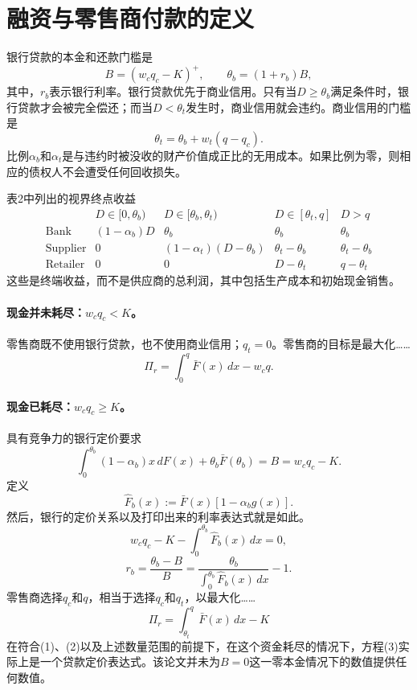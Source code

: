 \documentclass{article}
\begin{document}
\section*{融资与零售商付款的定义}
银行贷款的本金和还款门槛是
\[
B=(w_cq_c-K)^+,\qquad \theta_b=(1+r_b)B,
\]
其中，$r_b$表示银行利率。银行贷款优先于商业信用。只有当$D\geq\theta_b$满足条件时，银行贷款才会被完全偿还；而当$D<\theta_t$发生时，商业信用就会违约。商业信用的门槛是
\begin{equation}
\theta_t=\theta_b+w_t(q-q_c).\tag{1}
\end{equation}
比例$\alpha_b$和$\alpha_t$是与违约时被没收的财产价值成正比的无用成本。如果比例为零，则相应的债权人不会遭受任何回收损失。

表2中列出的视界终点收益
\[
\begin{array}{c|cccc}
& D\in[0,\theta_b)&D\in[\theta_b,\theta_t)&D\in[\theta_t,q]&D>q\\ \hline
\text{Bank}&(1-\alpha_b)D&\theta_b&\theta_b&\theta_b\\
\text{Supplier}&0&(1-\alpha_t)(D-\theta_b)&\theta_t-\theta_b&\theta_t-\theta_b\\
\text{Retailer}&0&0&D-\theta_t&q-\theta_t
\end{array}
\]
这些是终端收益，而不是供应商的总利润，其中包括生产成本和初始现金销售。

\paragraph{现金并未耗尽：$w_cq_c<K$。}
零售商既不使用银行贷款，也不使用商业信用；$q_t=0$。零售商的目标是最大化……
\[
\Pi_r=\int_0^q\bar F(x)\,dx-w_cq.
\]

\paragraph{现金已耗尽：$w_cq_c\geq K$。}
具有竞争力的银行定价要求
\[
\int_0^{\theta_b}(1-\alpha_b)x\,dF(x)
 +\theta_b\bar F(\theta_b)=B=w_cq_c-K.
\]
定义
\[
\hat F_b(x):=\bar F(x)[1-\alpha_bg(x)].
\]
然后，银行的定价关系以及打印出来的利率表达式就是如此。
\begin{equation}
w_cq_c-K-\int_0^{\theta_b}\hat F_b(x)\,dx=0,\tag{2}
\end{equation}
\begin{equation}
r_b=\frac{\theta_b-B}{B}
=\frac{\theta_b}{\displaystyle\int_0^{\theta_b}\hat F_b(x)\,dx}-1.\tag{3}
\end{equation}
零售商选择$q_c$和$q$，相当于选择$q_c$和$q_t$，以最大化……
\begin{equation}
\Pi_r=\int_{\theta_t}^{q}\bar F(x)\,dx-K\tag{4}
\end{equation}
在符合(1)、(2)以及上述数量范围的前提下，在这个资金耗尽的情况下，方程(3)实际上是一个贷款定价表达式。该论文并未为$B=0$这一零本金情况下的数值提供任何数值。
\end{document}
